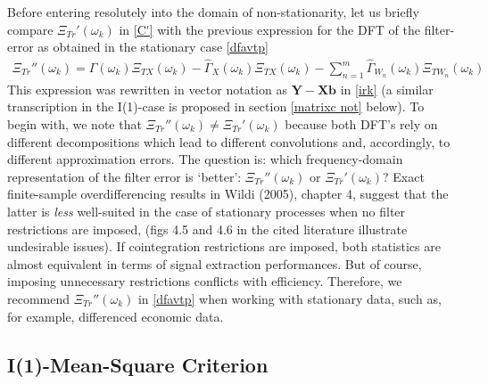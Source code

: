\documentclass[11pt]{article}
\begin{document}
Before entering resolutely into the domain of non-stationarity, let us briefly compare $\Xi_{Tr}'(\omega_k)$ in \ref{C'} with the previous expression for the DFT of the filter-error as obtained in the stationary case  \ref{dfavtp} 
\begin{eqnarray}\label{dft_stat}
\Xi_{Tr}''(\omega_k)=\Gamma(\omega_k)\Xi_{TX}(\omega_k)-\hat{\Gamma}_X(\omega_k)\Xi_{TX}(\omega_k)-\sum_{n=1}^m\hat{\Gamma}_{W_n}(\omega_k)\Xi_{TW_n}(\omega_k)
\end{eqnarray}
This  expression was rewritten in vector notation as $\mathbf{Y-Xb}$ in \ref{irk} (a similar transcription in the I(1)-case is proposed in section \ref{matrixc not} below). To begin with, we note that $\Xi_{Tr}''(\omega_k)\not=\Xi_{Tr}'(\omega_k)$ because both  DFT's  rely on different decompositions which lead to different convolutions and, accordingly, to different approximation errors.  The question is: which frequency-domain representation of the filter error is `better':  $\Xi_{Tr}''(\omega_k)$ or $\Xi_{Tr}'(\omega_k)$? Exact finite-sample overdifferencing results in Wildi (2005), chapter 4, suggest that the latter is \emph{less} well-suited in the case of stationary processes when no filter restrictions are imposed, (figs 4.5 and 4.6 in the cited literature illustrate undesirable issues). If cointegration restrictions are imposed, both statistics are almost equivalent in terms of signal extraction performances. But of course, imposing unnecessary restrictions conflicts with efficiency. Therefore, we recommend $\Xi_{Tr}''(\omega_k)$ in \ref{dfavtp} when working with stationary data, such as, for example, differenced economic data.



\subsection{ I(1)-Mean-Square Criterion}\label{coint_section}
\end{document}
